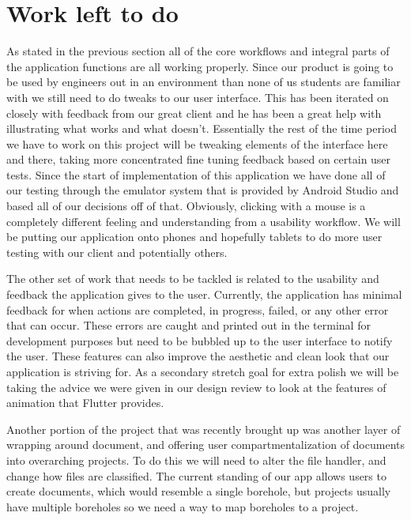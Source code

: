 \documentclass[onecolumn, draftclsnofoot,10pt, compsoc]{IEEEtran}
\begin{document}
\section{Work left to do}
As stated in the previous section all of the core workflows and integral parts of the application functions are all working properly. Since our product is going to be used by engineers out in an environment than none of us students are familiar with we still need to do tweaks to our user interface. This has been iterated on closely with feedback from our great client and he has been a great help with illustrating what works and what doesn't. Essentially the rest of the time period we have to work on this project will be tweaking elements of the interface here and there, taking more concentrated fine tuning feedback based on certain user tests. Since the start of implementation of this application we have done all of our testing through the emulator system that is provided by Android Studio and based all of our decisions off of that. Obviously, clicking with a mouse is a completely different feeling and understanding from a usability workflow. We will be putting our application onto phones and hopefully tablets to do more user testing with our client and potentially others. \par 
The other set of work that needs to be tackled is related to the usability and feedback the application gives to the user. Currently, the application has minimal feedback for when actions are completed, in progress, failed, or any other error that can occur. These errors are caught and printed out in the terminal for development purposes but need to be bubbled up to the user interface to notify the user. These features can also improve the aesthetic and clean look that our application is striving for. As a secondary stretch goal for extra polish we will be taking the advice we were given in our design review to look at the features of animation that Flutter provides.\par
Another portion of the project that was recently brought up was another layer of wrapping around document, and offering user compartmentalization of documents into overarching projects. To do this we will need to alter the file handler, and change how files are classified. The current standing of our app allows users to create documents, which would resemble a single borehole, but projects usually have multiple boreholes so we need a way to map boreholes to a project.
\end{document}

